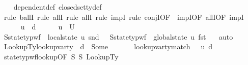 \begin{isabellebody}
\ \ %
\endisadelimproof
%
\isatagproof
{}\isamarkupfalse%
\ dependent{\isacharunderscore}{\kern0pt}def\ closed{\isacharunderscore}{\kern0pt}set{\isacharunderscore}{\kern0pt}ty{\isacharunderscore}{\kern0pt}def\isanewline
\ \ \isamarkupfalse%
\ {\isacharparenleft}{\kern0pt}rule\ ballI{\isacharcomma}{\kern0pt}\ rule\ allI{\isacharcomma}{\kern0pt}\ rule\ allI{\isacharcomma}{\kern0pt}\ rule\ impI{\isacharcomma}{\kern0pt}\ rule\ conjI{\isacharbrackleft}{\kern0pt}OF\ {\isacharunderscore}{\kern0pt}\ impI{\isacharbrackleft}{\kern0pt}OF\ allI{\isacharbrackleft}{\kern0pt}OF\ impI{\isacharbrackright}{\kern0pt}{\isacharbrackright}{\kern0pt}{\isacharbrackright}{\kern0pt}{\isacharparenright}{\kern0pt}\isanewline
\ \ \ \ \isamarkupfalse%
\ u\ {\isasymtau}\ d\isanewline
\ \ \ \ \isamarkupfalse%
\ {\isachardoublequoteopen}u\ {\isasymin}\ {\isacharquery}{\kern0pt}U{\isachardoublequoteclose}\isanewline
\ \ \ \ \isamarkupfalse%
\ S{}{\isacharcolon}{\kern0pt}{\isachardoublequoteopen}state{\isacharunderscore}{\kern0pt}typ{\isacharunderscore}{\kern0pt}wf\ {\isasymOmega}\ {\isacharparenleft}{\kern0pt}local{\isacharunderscore}{\kern0pt}state\ u{\isacharparenright}{\kern0pt}\ {\isacharparenleft}{\kern0pt}snd\ {\isasymLambda}{\isacharprime}{\kern0pt}{\isacharparenright}{\kern0pt}{\isachardoublequoteclose}\ \ S{}{\isacharcolon}{\kern0pt}{\isachardoublequoteopen}state{\isacharunderscore}{\kern0pt}typ{\isacharunderscore}{\kern0pt}wf\ {\isasymOmega}\ {\isacharparenleft}{\kern0pt}global{\isacharunderscore}{\kern0pt}state\ u{\isacharparenright}{\kern0pt}\ {\isacharparenleft}{\kern0pt}fst\ {\isasymLambda}{\isacharprime}{\kern0pt}{\isacharparenright}{\kern0pt}{\isachardoublequoteclose}\ \isamarkupfalse%
\ auto\isanewline
\ \ \ \ \isamarkupfalse%
\ LookupTy{\isacharcolon}{\kern0pt}{\isachardoublequoteopen}lookup{\isacharunderscore}{\kern0pt}var{\isacharunderscore}{\kern0pt}ty\ {\isasymLambda}{\isacharprime}{\kern0pt}\ d\ {\isacharequal}{\kern0pt}\ Some\ {\isasymtau}{\isachardoublequoteclose}\isanewline
\ \ \ \ \isamarkupfalse%
\ {\isachardoublequoteopen}lookup{\isacharunderscore}{\kern0pt}var{\isacharunderscore}{\kern0pt}ty{\isacharunderscore}{\kern0pt}match\ {\isasymLambda}{\isacharprime}{\kern0pt}\ {\isasymOmega}\ u\ d\ {\isasymtau}{\isachardoublequoteclose}\isanewline
\ \ \ \ \ \ \isamarkupfalse%
\ state{\isacharunderscore}{\kern0pt}typ{\isacharunderscore}{\kern0pt}wf{\isacharunderscore}{\kern0pt}lookup{\isacharbrackleft}{\kern0pt}OF\ S{}\ S{}\ LookupTy{\isacharbrackright}{\kern0pt}\ \isanewline

\end{isabellebody}
